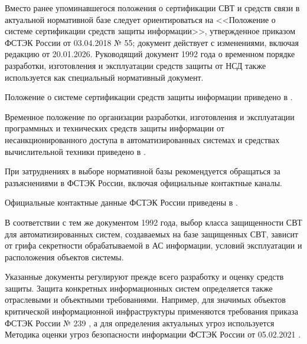 Вместо ранее упоминавшегося положения о сертификации СВТ и средств связи в актуальной нормативной базе следует ориентироваться на <<Положение о системе сертификации средств защиты информации>>, утвержденное приказом ФСТЭК России от 03.04.2018 № 55; документ действует с изменениями, включая редакцию от 20.01.2026. Руководящий документ 1992 года о временном порядке разработки, изготовления и эксплуатации средств защиты от НСД также используется как специальный нормативный документ.

Положение о системе сертификации средств защиты информации приведено в \cite{FSTECCertificationSystem}.

Временное положение по организации разработки, изготовления и эксплуатации программных и технических средств защиты информации от несанкционированного доступа в автоматизированных системах и средствах вычислительной техники приведено в \cite{GTKTemporaryRegulation}.

При затруднениях в выборе нормативной базы рекомендуется обращаться за разъяснениями в ФСТЭК России, включая официальные контактные каналы.

Официальные контактные данные ФСТЭК России приведены в \cite{FSTECContacts}.

В соответствии с тем же документом 1992 года, выбор класса защищенности СВТ для автоматизированных систем, создаваемых на базе защищенных СВТ, зависит от грифа секретности обрабатываемой в АС информации, условий эксплуатации и расположения объектов системы.

Указанные документы регулируют прежде всего разработку и оценку средств защиты. Защита конкретных информационных систем определяется также отраслевыми и объектными требованиями. Например, для значимых объектов критической информационной инфраструктуры применяются требования приказа ФСТЭК России № 239 \cite{FSTEKOBKIS}, а для определения актуальных угроз используется Методика оценки угроз безопасности информации ФСТЭК России от 05.02.2021 \cite{FSTECThreatAssessment2021}.

